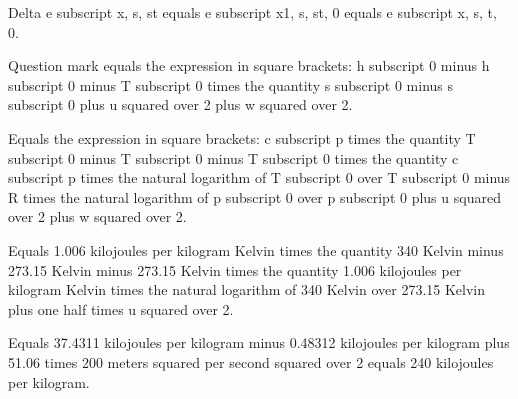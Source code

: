 Delta e subscript x, s, st equals e subscript x1, s, st, 0 equals e subscript x, s, t, 0.

Question mark equals the expression in square brackets: h subscript 0 minus h subscript 0 minus T subscript 0 times the quantity s subscript 0 minus s subscript 0 plus u squared over 2 plus w squared over 2.

Equals the expression in square brackets: c subscript p times the quantity T subscript 0 minus T subscript 0 minus T subscript 0 times the quantity c subscript p times the natural logarithm of T subscript 0 over T subscript 0 minus R times the natural logarithm of p subscript 0 over p subscript 0 plus u squared over 2 plus w squared over 2.

Equals 1.006 kilojoules per kilogram Kelvin times the quantity 340 Kelvin minus 273.15 Kelvin minus 273.15 Kelvin times the quantity 1.006 kilojoules per kilogram Kelvin times the natural logarithm of 340 Kelvin over 273.15 Kelvin plus one half times u squared over 2.

Equals 37.4311 kilojoules per kilogram minus 0.48312 kilojoules per kilogram plus 51.06 times 200 meters squared per second squared over 2 equals 240 kilojoules per kilogram.
